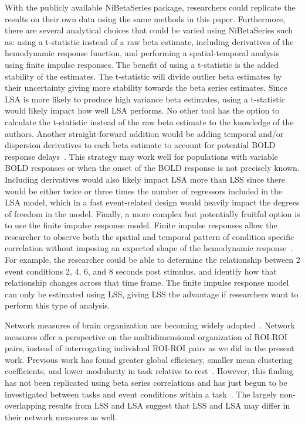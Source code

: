 \documentclass[phd,figures,tables,ackpage,abstractpage,publicabstractpage]{uithesis}
\begin{document}
With the publicly available NiBetaSeries package, researchers could replicate the
results on their own data using the same methods in this paper.
Furthermore, there are several analytical choices that could be varied using NiBetaSeries such as:
using a t-statistic instead of a raw beta estimate, including derivatives of the hemodynamic response function,
and performing a spatial-temporal analysis using finite impulse responses.
The benefit of using a t-statistic is the added stability of the estimates.
The t-statistic will divide outlier beta estimates by their uncertainty giving more stability
towards the beta series estimates.
Since LSA is more likely to produce high variance beta estimates, using a t-statistic would likely impact
how well LSA performs.
No other tool has the option to calculate the t-statistic instead of the raw beta estimate to the knowledge
of the authors.
Another straight-forward addition would be adding temporal and/or dispersion derivatives to each beta
estimate to account for potential BOLD response delays~\cite{Calhoun2004,Gottlich2015}.
This strategy may work well for populations with variable BOLD responses or when the onset of the BOLD
response is not precisely known.
Including derivatives would also likely impact LSA more than LSS since there would be either twice or
three times the number of regressors included in the LSA model, which in a fast event-related design
would heavily impact the degrees of freedom in the model.
Finally, a more complex but potentially fruitful option is to use the finite impulse response model.
Finite impulse responses allow the researcher to observe both the spatial and temporal pattern of
condition specific correlation without imposing an expected shape of the hemodynamic response~\cite{Turner2012a}.
For example, the researcher could be able to determine the relationship between 2 event conditions
2, 4, 6, and 8 seconds post stimulus, and identify how that relationship changes across
that time frame.
The finite impulse response model can only be estimated using LSS, giving LSS the advantage if researchers
want to perform this type of analysis.

Network measures of brain organization are becoming widely adopted~\cite{Rubinov2010}.
Network measures offer a perspective on the multidimensional organization of ROI-ROI pairs, instead of
interrogating individual ROI-ROI pairs as we did in the present work.
Previous work has found greater global efficiency, smaller mean clustering coefficients, and lower modularity in
task relative to rest~\cite{Di2013}.
However, this finding has not been replicated using beta series correlations and has just begun
to be investigated between tasks and event conditions within a task~\cite{Di2019a}.
The largely non-overlapping results from LSS and LSA suggest that LSS and LSA may differ
in their network measures as well.
\end{document}
